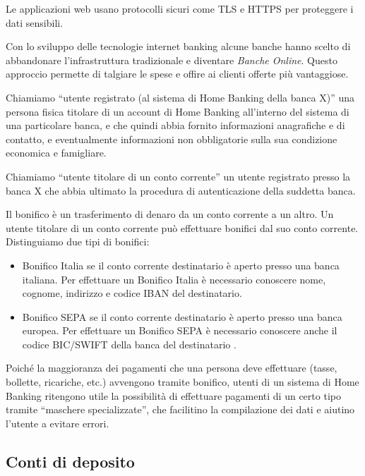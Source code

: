 \documentclass[10pt]{softeng} %
\begin{document}
Le applicazioni web usano protocolli sicuri come TLS e HTTPS per proteggere i dati sensibili.

Con lo sviluppo delle tecnologie internet banking alcune banche hanno scelto di abbandonare l'infrastruttura tradizionale e diventare \emph{Banche Online}. Questo approccio permette di talgiare le spese e offire ai clienti offerte pi\`u vantaggiose.

Chiamiamo ``utente registrato (al sistema di Home Banking della banca X)'' una persona fisica titolare di un account di Home Banking all'interno del sistema di una particolare banca, e che quindi abbia fornito informazioni anagrafiche e di contatto, e eventualmente informazioni non obbligatorie sulla sua condizione economica e famigliare.

Chiamiamo ``utente titolare di un conto corrente'' un utente registrato presso la banca X che abbia ultimato la procedura di autenticazione della suddetta banca.

Il bonifico \`e un trasferimento di denaro da un conto corrente a un altro.
Un utente titolare di un conto corrente pu\`o effettuare bonifici dal suo conto corrente.
Distinguiamo due tipi di bonifici:
\begin{itemize}
	\item Bonifico Italia se il conto corrente destinatario \`e aperto presso una banca italiana.
	Per effettuare un Bonifico Italia \`e necessario conoscere nome, cognome, indirizzo e codice IBAN del destinatario.
	\item Bonifico SEPA se il conto corrente destinatario \`e aperto presso una banca europea. Per effettuare un Bonifico SEPA \`e necessario conoscere anche il codice BIC/SWIFT della banca del destinatario \cite{bonifico_unicredit}.
\end{itemize}
Poich\'e la maggioranza dei pagamenti che una persona deve effettuare (tasse, bollette, ricariche, etc.) avvengono tramite bonifico, utenti di un sistema di Home Banking ritengono utile la possibilit\`a di effettuare pagamenti di un certo tipo tramite ``maschere specializzate'', che facilitino la compilazione dei dati e aiutino l'utente a evitare errori.

\subsection{Conti di deposito}
\end{document}
